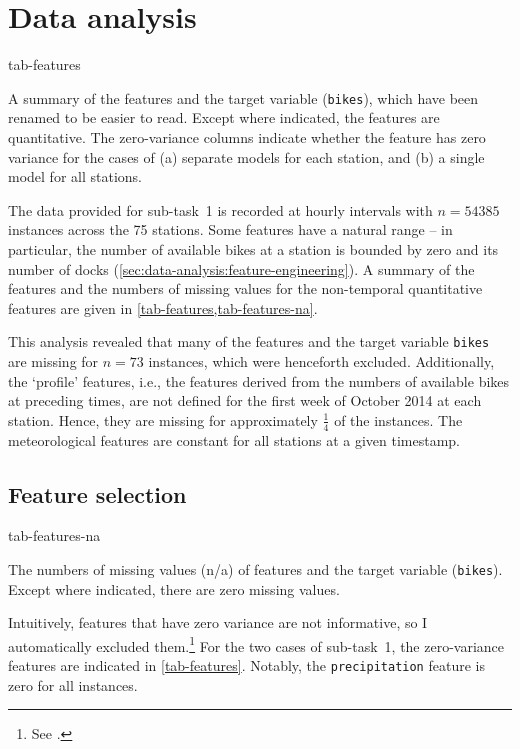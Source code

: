 \section{Data analysis}
\label{sec:data-analysis}

\begin{table}
  \centering
  {tab-features}
  \caption{
    A summary of the features and the target variable (\texttt{bikes}), which have been renamed to be easier to read.
    Except where indicated, the features are quantitative.
    The zero-variance columns indicate whether the feature has zero variance for the cases
    of (a) separate models for each station, and (b) a single model for all stations.
  }
  \label{tab-features}
\end{table}

The data provided for sub-task~1 is recorded at hourly intervals with $n = 54385$
instances across the 75 stations.
Some features have a natural range -- in particular, the number of available bikes at a
station is bounded by zero and its number of docks
(\cref{sec:data-analysis:feature-engineering}).
A summary of the features and the numbers of missing values for the non-temporal
quantitative features are given in \cref{tab-features,tab-features-na}.

This analysis revealed that many of the features and the target variable \texttt{bikes}
are missing for $n = 73$ instances, which were henceforth excluded.
Additionally, the `profile' features, i.e., the features derived from the numbers of
available bikes at preceding times, are not defined for the first week of October 2014
at each station.
Hence, they are missing for approximately $\frac{1}{4}$ of the instances.
The meteorological features are constant for all stations at a given timestamp.

\subsection{Feature selection}
\label{sec:data-analysis:feature-selection}

\begin{table}
  \centering
  {tab-features-na}
  \caption{
    The numbers of missing values (n/a) of features and the target variable (\texttt{bikes}).
    Except where indicated, there are zero missing values.
  }
  \label{tab-features-na}
\end{table}

Intuitively, features that have zero variance are not informative, so I automatically
excluded them.\footnote{See .} For the
two cases of sub-task~1, the zero-variance features are indicated in
\cref{tab-features}.
Notably, the \texttt{precipitation} feature is zero for all instances.

